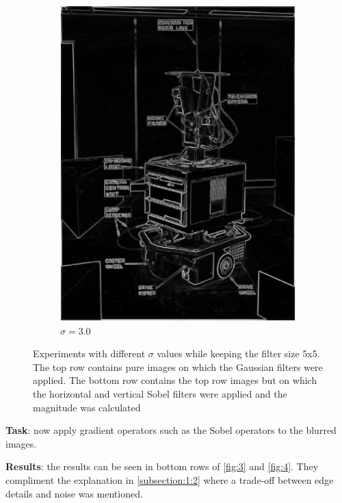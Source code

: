 \documentclass[lettersize,journal]{IEEEtran}
\begin{document}
\begin{figure}[h]
\begin{subfigure}[h]{0.115\textwidth}
        \includegraphics[width=\linewidth]{gaussian_edge_map_5x5_sigma_3}
        \caption{$\sigma=3.0$}  
    \end{subfigure}
    \caption{Experiments with different $\sigma$ values while keeping the filter size 5x5. The top row contains pure images on which the Gaussian filters were applied. The bottom row contains the top row images but on which the horizontal and vertical Sobel filters were applied and the magnitude was calculated}
    \label{fig:4}
\end{figure}

\noindent\textbf{Task}: now apply gradient operators such as the Sobel operators to the  blurred images.

\hfill

\noindent\textbf{Results}: the results can be seen in bottom rows of \autoref{fig:3} and \autoref{fig:4}. They compliment the explanation in \autoref{subsection:1:2} where a trade-off between edge details and noise was mentioned.
\end{document}
